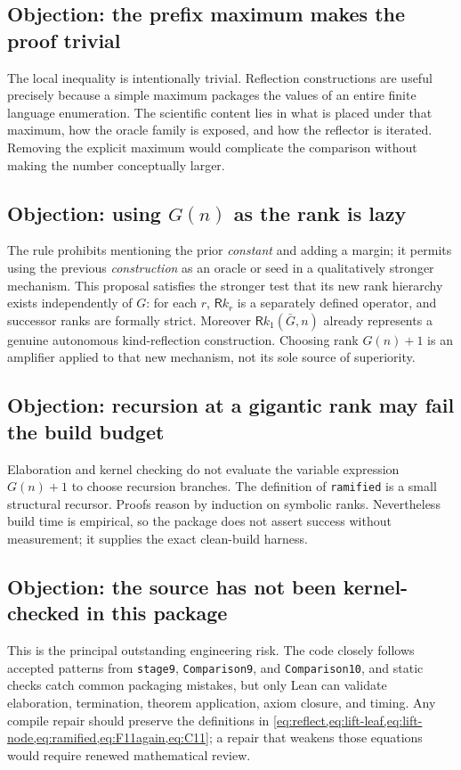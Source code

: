 \documentclass[11pt,oneside]{article}
\theoremstyle{definition}
\newcommand{\Ram}{\mathsf Rk}
\newcommand{\code}[1]{\texttt{#1}}
\begin{document}
\subsection{Objection: the prefix maximum makes the proof trivial}

The local inequality is intentionally trivial.  Reflection constructions are
useful precisely because a simple maximum packages the values of an entire
finite language enumeration.  The scientific content lies in what is placed
under that maximum, how the oracle family is exposed, and how the reflector is
iterated.  Removing the explicit maximum would complicate the comparison
without making the number conceptually larger.

\subsection{Objection: using $G(n)$ as the rank is lazy}

The rule prohibits mentioning the prior \emph{constant} and adding a margin;
it permits using the previous \emph{construction} as an oracle or seed in a
qualitatively stronger mechanism.  This proposal satisfies the stronger test
that its new rank hierarchy exists independently of $G$: for each $r$,
$\Ram_r$ is a separately defined operator, and successor ranks are formally
strict.  Moreover $\Ram_1(\bar G,n)$ already represents a genuine autonomous
kind-reflection construction.  Choosing rank $G(n)+1$ is an amplifier applied
to that new mechanism, not its sole source of superiority.

\subsection{Objection: recursion at a gigantic rank may fail the build budget}

Elaboration and kernel checking do not evaluate the variable expression
$G(n)+1$ to choose recursion branches.  The definition of \code{ramified} is a
small structural recursor.  Proofs reason by induction on symbolic ranks.
Nevertheless build time is empirical, so the package does not assert success
without measurement; it supplies the exact clean-build harness.

\subsection{Objection: the source has not been kernel-checked in this package}

This is the principal outstanding engineering risk.  The code closely follows
accepted patterns from \code{stage9}, \code{Comparison9}, and
\code{Comparison10}, and static checks catch common packaging mistakes, but
only Lean can validate elaboration, termination, theorem application, axiom
closure, and timing.  Any compile repair should preserve the definitions in
\cref{eq:reflect,eq:lift-leaf,eq:lift-node,eq:ramified,eq:F11again,eq:C11}; a
repair that weakens those equations would require renewed mathematical review.
\end{document}
